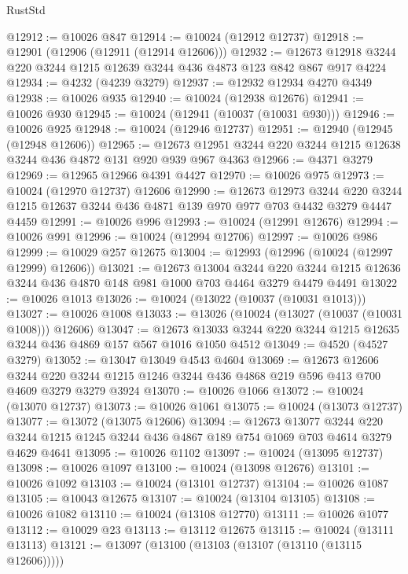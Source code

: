 \begin{lexlean}{RustStd}
\begin{coremodule}
@12912 := @10026 @847
@12914 := @10024 (@12912 @12737)
@12918 := @12901 (@12906 (@12911 (@12914 @12606)))
@12932 := @12673 @12918 @3244 @220 @3244 @1215 @12639 @3244 @436 @4873 @123 @842 @867 @917 @4224
@12934 := @4232 (@4239 @3279)
@12937 := @12932 @12934 @4270 @4349
@12938 := @10026 @935
@12940 := @10024 (@12938 @12676)
@12941 := @10026 @930
@12945 := @10024 (@12941 (@10037 (@10031 @930)))
@12946 := @10026 @925
@12948 := @10024 (@12946 @12737)
@12951 := @12940 (@12945 (@12948 @12606))
@12965 := @12673 @12951 @3244 @220 @3244 @1215 @12638 @3244 @436 @4872 @131 @920 @939 @967 @4363
@12966 := @4371 @3279
@12969 := @12965 @12966 @4391 @4427
@12970 := @10026 @975
@12973 := @10024 (@12970 @12737) @12606
@12990 := @12673
    @12973
    @3244
    @220
    @3244
    @1215
    @12637
    @3244
    @436
    @4871
    @139
    @970
    @977
    @703
    @4432
    @3279
    @4447
    @4459
@12991 := @10026 @996
@12993 := @10024 (@12991 @12676)
@12994 := @10026 @991
@12996 := @10024 (@12994 @12706)
@12997 := @10026 @986
@12999 := @10029 @257 @12675
@13004 := @12993 (@12996 (@10024 (@12997 @12999) @12606))
@13021 := @12673
    @13004
    @3244
    @220
    @3244
    @1215
    @12636
    @3244
    @436
    @4870
    @148
    @981
    @1000
    @703
    @4464
    @3279
    @4479
    @4491
@13022 := @10026 @1013
@13026 := @10024 (@13022 (@10037 (@10031 @1013)))
@13027 := @10026 @1008
@13033 := @13026 (@10024 (@13027 (@10037 (@10031 @1008))) @12606)
@13047 := @12673 @13033 @3244 @220 @3244 @1215 @12635 @3244 @436 @4869 @157 @567 @1016 @1050 @4512
@13049 := @4520 (@4527 @3279)
@13052 := @13047 @13049 @4543 @4604
@13069 := @12673
    @12606
    @3244
    @220
    @3244
    @1215
    @1246
    @3244
    @436
    @4868
    @219
    @596
    @413
    @700
    @4609
    @3279
    @3279
    @3924
@13070 := @10026 @1066
@13072 := @10024 (@13070 @12737)
@13073 := @10026 @1061
@13075 := @10024 (@13073 @12737)
@13077 := @13072 (@13075 @12606)
@13094 := @12673
    @13077
    @3244
    @220
    @3244
    @1215
    @1245
    @3244
    @436
    @4867
    @189
    @754
    @1069
    @703
    @4614
    @3279
    @4629
    @4641
@13095 := @10026 @1102
@13097 := @10024 (@13095 @12737)
@13098 := @10026 @1097
@13100 := @10024 (@13098 @12676)
@13101 := @10026 @1092
@13103 := @10024 (@13101 @12737)
@13104 := @10026 @1087
@13105 := @10043 @12675
@13107 := @10024 (@13104 @13105)
@13108 := @10026 @1082
@13110 := @10024 (@13108 @12770)
@13111 := @10026 @1077
@13112 := @10029 @23
@13113 := @13112 @12675
@13115 := @10024 (@13111 @13113)
@13121 := @13097 (@13100 (@13103 (@13107 (@13110 (@13115 @12606)))))

\end{coremodule}
\end{lexlean}
